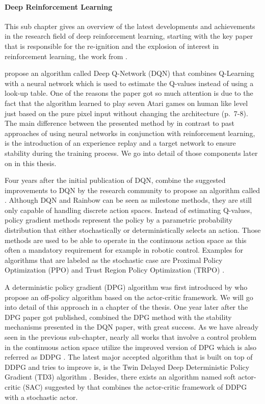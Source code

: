 \paragraph{Deep Reinforcement Learning}
This sub chapter gives an overview of the latest developments and achievements in the research field of deep reinforcement learning, starting with the key paper that is responsible for the re-ignition and the explosion of interest in reinforcement learning, the work from \cite{mnih2013playing, mnih2015human}.
\par 
\cite{mnih2013playing} propose an algorithm called Deep Q-Network
(DQN) that combines Q-Learning with a neural network which is used to estimate the Q-values instead of using a look-up table. One of the reasons the paper got so much attention is due to the fact that the algorithm learned to play seven Atari games on human like level just based on the pure pixel input without changing the architecture (p.~7-8). The main difference between the presented method by \cite{mnih2013playing} in contrast to past approaches of using neural networks in conjunction with reinforcement learning, is the introduction of an experience replay and a target network to ensure stability during the training process. We go into detail of those components later on in this thesis.
\par
Four years after the initial publication of DQN, \cite{hessel2018rainbow} combine the suggested improvements to DQN by the research community to propose an algorithm called . Although DQN and Rainbow can be seen as milestone methods, they are still only capable of handling discrete action spaces. Instead of estimating Q-values, policy gradient methods represent the policy by a parametric probability distribution that either stochastically or deterministically selects an action. Those methods are used to be able to operate in the continuous action space as this often a mandatory requirement for example in robotic control. Examples for algorithms that are labeled as the stochastic case are Proximal Policy Optimization (PPO) \cite[]{schulman2017proximal} and Trust Region Policy Optimization (TRPO) \cite[]{schulman2017trust}.
\par 
A deterministic policy gradient (DPG) algorithm was first introduced by \cite{silver2014deterministic} who propose an off-policy algorithm based on the actor-critic framework. We will go into detail of this approach in a chapter of the thesis. One year later after the DPG paper got published, \cite{lillicrap2019continuous} combined the DPG method with the stability mechanisms presented in the DQN paper, with great success. As we have already seen in the previous sub-chapter, nearly all works that involve  a control problem in the continuous action space utilize the improved version of DPG which is also referred as DDPG \cite[p.~2]{lillicrap2019continuous}. The latest major accepted algorithm that is built on top of DDPG and tries to improve is, is the Twin Delayed Deep Deterministic Policy Gradient (TD3) algorithm \cite[]{fujimoto2018addressing}. Besides, there exists an algorithm named soft actor-critic (SAC) suggested by \cite{haarnoja2018soft} that combines the actor-critic framework of DDPG with a stochastic actor.
